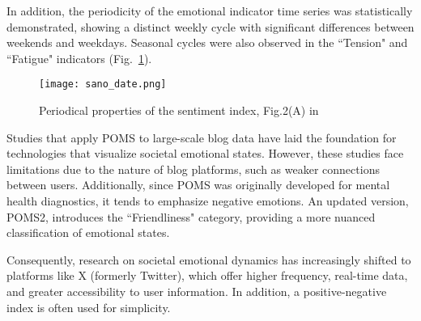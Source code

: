 In addition, the periodicity of the emotional indicator time series was statistically demonstrated, showing a distinct weekly cycle with significant differences between weekends and weekdays. Seasonal cycles were also observed in the ``Tension" and ``Fatigue" indicators (Fig.~\ref{fig2}).

\begin{figure}[htbp] \centering \texttt{[image: sano\_date.png]} \caption{Periodical properties of the sentiment index, Fig.2(A) in \cite{POMS_PLOS}} \label{fig2} \end{figure}

Studies that apply POMS to large-scale blog data have laid the foundation for technologies that visualize societal emotional states. However, these studies face limitations due to the nature of blog platforms, such as weaker connections between users. Additionally, since POMS was originally developed for mental health diagnostics, it tends to emphasize negative emotions. An updated version, POMS2, introduces the ``Friendliness" category, providing a more nuanced classification of emotional states.

Consequently, research on societal emotional dynamics has increasingly shifted to platforms like X (formerly Twitter), which offer higher frequency, real-time data, and greater accessibility to user information. In addition, a positive-negative index is often used for simplicity.